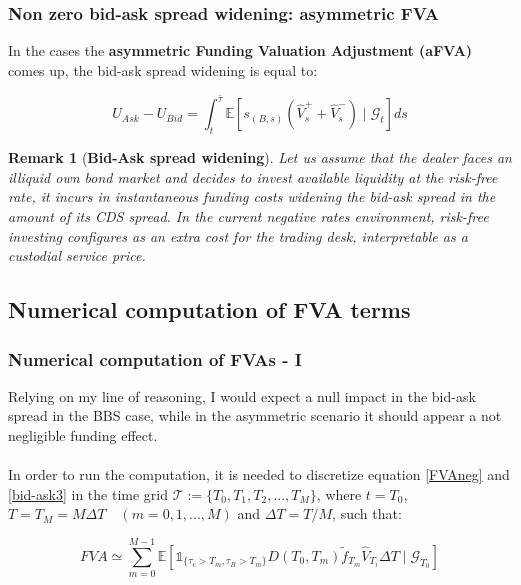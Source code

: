 \documentclass{beamer}
\newtheorem{remark}{Remark}
\begin{document}
\begin{frame}
\frametitle{Non zero bid-ask spread widening: asymmetric FVA}
	In the cases the \textbf{asymmetric Funding Valuation Adjustment (aFVA)} comes up, the bid-ask spread widening is equal to:
	
	\begin{equation}\label{bid-ask3}
		U_{Ask}-U_{Bid}= \int_{t}^{\bar{\tau} }  \mathbb{E} \left[  s_{(B,s)}\left( \hat{V}_{s}^{+} + \hat{V}_{s}^{-} \right) \mid \mathcal{G}_{t} \right] ds
	\end{equation}

	\begin{remark}[\textbf{Bid-Ask spread widening}]
	Let us assume that the dealer faces an illiquid own bond market and decides to invest available liquidity at the risk-free rate, it incurs in instantaneous funding costs widening the bid-ask spread in the amount of its CDS spread. In the current negative rates environment, risk-free investing configures as an extra cost for the trading desk, interpretable as a custodial service price. 
	\end{remark}
\end{frame}



\subsection{Numerical computation of FVA terms}

\begin{frame}
\frametitle{Numerical computation of FVAs - I}
	Relying on my line of reasoning, I would expect a null impact in the bid-ask spread in the BBS case, while in the asymmetric scenario it should appear a not negligible funding effect. \\~\\

	In order to run the computation, it is needed to discretize equation \ref{FVAneg} and \ref{bid-ask3} in the time grid  $\mathcal{T} := \{T_0,T_1,T_2,...,T_M\}$, where $t=T_0$, $T=T_M = M \Delta T\quad (m=0,1,...,M)$ and $\Delta T = T/M$, such that:

	\begin{equation}
		FVA \simeq \sum_{m = 0}^{M-1}  \mathbb{E} [ \mathds{1}_{ \{\tau_c > T_m , \tau_B>T_m\} }D(T_0, T_m)\tilde{f}_{T_m} \hat{V}_{T_i}\Delta T \mid \mathcal{G}_{T_0}]
	\end{equation}

\end{frame}
\end{document}
